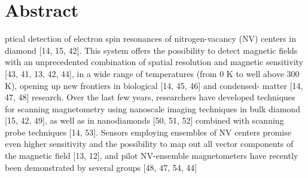 \section*{Abstract}
ptical detection of electron spin resonances of nitrogen-vacancy
(NV) centers in diamond [14, 15, 42].  This system offers the possibility to detect
magnetic fields with an unprecedented combination of spatial resolution and magnetic
sensitivity [43, 41, 13, 42, 44], in a wide range of temperatures (from 0 K to well
above 300 K), opening up new frontiers in biological [14, 45, 46] and condensed-
matter [14, 47, 48] research.  Over the last few years, researchers have developed
techniques for scanning magnetometry using nanoscale imaging techniques in bulk
diamond [15, 42, 49], as well as in nanodiamonds [50, 51, 52] combined with scanning
probe techniques [14, 53]. Sensors employing ensembles of NV centers promise even
higher sensitivity and the possibility to map out all vector components of the magnetic
field [13, 12], and pilot NV-ensemble magnetometers have recently been demonstrated
by several groups [48, 47, 54, 44]
